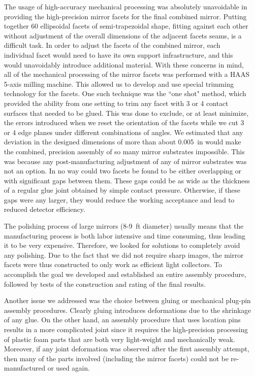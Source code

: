 The usage of high-accuracy mechanical processing was absolutely unavoidable in providing the high-precision mirror
facets for the final combined mirror. Putting together 60 ellipsoidal facets of semi-trapezoidal shape, fitting against
each other without adjustment of the overall dimensions of the adjacent facets seams, is a difficult task. In order to
adjust the facets of the combined mirror, each individual facet would need to have its own support infrastructure,
and this would unavoidably introduce additional material. With these concerns in mind, all of the mechanical processing
of the mirror facets was performed with a HAAS 5-axis milling machine. This allowed us to develop and use special
trimming technology for the facets. One such technique was the ``one shot" method, which provided the ability from
one setting to trim any facet with 3 or 4 contact surfaces that needed to be glued. This was done to exclude, or at
least minimize, the errors introduced when we reset the orientation of the facets while we cut 3 or 4 edge planes
under different combinations of angles. We estimated that any deviation in the designed dimensions of more than
about 0.005~in would make the combined, precision assembly of so many mirror substrates impossible. This was
because any post-manufacturing adjustment of any of mirror substrates was not an option. In no way could two facets
be found to be either overlapping or with significant gaps between them. These gaps could be as wide as the thickness
of a regular glue joint obtained by simple contact pressure. Otherwise, if these gaps were any larger, they would
reduce the working acceptance and lead to reduced detector efficiency.

The polishing process of large mirrors (8-9~ft diameter) usually means that the manufacturing process is both
labor intensive and time consuming, thus leading it to be very expensive. Therefore, we looked for solutions to
completely avoid any polishing. Due to the fact that we did not require sharp images, the mirror facets were thus
constructed to only work as efficient light collectors. To accomplish the goal we developed and established an entire
assembly procedure, followed by tests of the construction and rating of the final results.

Another issue we addressed was the choice between gluing or mechanical plug-pin assembly procedures. Clearly
gluing introduces deformations due to the shrinkage of any glue. On the other hand, an assembly procedure that
uses location pins results in a more complicated joint since it requires the high-precision processing of plastic foam
parts that are both very light-weight and mechanically weak. Moreover, if any joint deformation was observed after
the first assembly attempt, then many of the parts involved (including the mirror facets) could not be
re-manufactured or used again.

